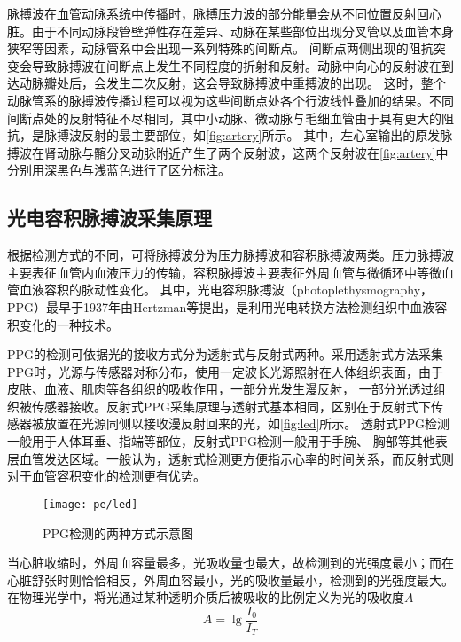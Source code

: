 脉搏波在血管动脉系统中传播时，脉搏压力波的部分能量会从不同位置反射回心脏。由于不同动脉段管壁弹性存在差异、动脉在某些部位出现分叉管以及血管本身狭窄等因素，动脉管系中会出现一系列特殊的间断点。
间断点两侧出现的阻抗突变会导致脉搏波在间断点上发生不同程度的折射和反射。动脉中向心的反射波在到达动脉瓣处后，会发生二次反射，这会导致脉搏波中重搏波的出现。
这时，整个动脉管系的脉搏波传播过程可以视为这些间断点处各个行波线性叠加的结果\cite{THOCBPM}。不同间断点处的反射特征不尽相同，其中小动脉、微动脉与毛细血管由于具有更大的阻抗，是脉搏波反射的最主要部位，如\autoref{fig:artery}所示。
其中，左心室输出的原发脉搏波在肾动脉与髂分叉动脉附近产生了两个反射波，这两个反射波在\autoref{fig:artery}中分别用深黑色与浅蓝色进行了区分标注。

\subsection{光电容积脉搏波采集原理}
根据检测方式的不同，可将脉搏波分为压力脉搏波和容积脉搏波两类。压力脉搏波主要表征血管内血液压力的传输，容积脉搏波主要表征外周血管与微循环中等微血管血液容积的脉动性变化。
其中，光电容积脉搏波（photoplethysmography，PPG）最早于1937年由Hertzman等\cite{Hertzman1937}提出，是利用光电转换方法检测组织中血液容积变化的一种技术。

PPG的检测可依据光的接收方式分为透射式与反射式两种\cite{THOCBPM}。采用透射式方法采集PPG时，光源与传感器对称分布，使用一定波长光源照射在人体组织表面，由于皮肤、血液、肌肉等各组织的吸收作用，一部分光发生漫反射，
一部分光透过组织被传感器接收。反射式PPG采集原理与透射式基本相同，区别在于反射式下传感器被放置在光源同侧以接收漫反射回来的光\cite{THOCBPM,mmt}，如\autoref{fig:led}所示。
透射式PPG检测一般用于人体耳垂、指端等部位，反射式PPG检测一般用于手腕、
胸部等其他表层血管发达区域\cite{THOCBPM}。一般认为，透射式检测更方便指示心率的时间关系，而反射式则对于血管容积变化的检测更有优势\cite{mmt}。
\begin{figure}[htbp]
    \centering
    \texttt{[image: pe/led]}
    \caption[PPG检测的两种方式示意图]{\label{fig:led}PPG检测的两种方式示意图\cite{THOCBPM}}
\end{figure}

当心脏收缩时，外周血容量最多，光吸收量也最大，故检测到的光强度最小；而在心脏舒张时则恰恰相反，外周血容最小，光的吸收量最小，检测到的光强度最大\cite{lhc}。
在物理光学中，将光通过某种透明介质后被吸收的比例定义为光的吸收度$A$
\begin{equation}
    \label{equ:LBL}
    A=\lg\frac{I_{0}}{I_{T}}
\end{equation}

